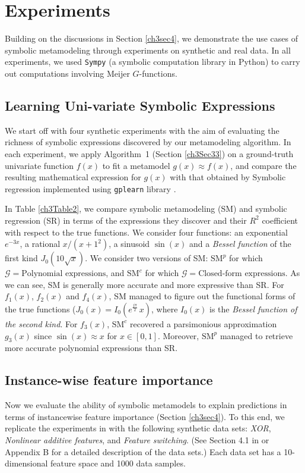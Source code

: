 \documentclass [PhD] {uclathes}
\begin{document}
\section{Experiments}
\label{ch3Sec5}
Building on the discussions in Section \ref{ch3sec4}, we demonstrate the use cases of symbolic metamodeling through experiments on synthetic and real data. In all experiments, we used \texttt{Sympy} \cite{10.7717/peerj-cs.103} (a symbolic computation library in Python) to carry out computations involving Meijer $G$-functions.

\subsection{Learning Uni-variate Symbolic Expressions} 
\label{Sec51}

We start off with four synthetic experiments with the aim of evaluating the richness of symbolic expressions discovered by our metamodeling algorithm. In each experiment, we apply Algorithm~1 (Section \ref{ch3Sec33}) on a ground-truth univariate function $f(x)$ to fit a metamodel $g(x) \approx f(x)$, and compare the resulting mathematical expression for $g(x)$ with that obtained by Symbolic regression \cite{orzechowski2018we} implemented using \texttt{gplearn} library \cite{stephens2015gplearn}.

In Table \ref{ch3Table2}, we compare symbolic metamodeling (SM) and symbolic regression (SR) in terms of the expressions they discover and their $R^2$ coefficient with respect to the true functions. We consider four functions: an exponential $e^{-3x}$, a rational $x/(x+1^2)$, a sinusoid $\sin(x)$ and a {\it Bessel function} of the first kind $J_0(10\sqrt{x})$. We consider two versions of SM: $\mbox{SM}^{p}$ for which $\mathcal{G}=\mbox{Polynomial expressions}$, and $\mbox{SM}^{c}$ for which $\mathcal{G}=\mbox{Closed-form expressions}$. As we can see, SM is generally more accurate and more expressive than SR. For $f_1(x)$, $f_2(x)$ and $f_4(x)$, SM managed to figure out the functional forms of the true functions  ($J_0(x) = I_{0}(e^{\frac{j\pi}{2}}\,x)$, where $I_0(x)$ is the {\it Bessel function of the second kind}. For $f_3(x)$, $\mbox{SM}^{c}$ recovered a parsimonious approximation $g_3(x)$ since $\sin(x) \approx x$ for $x \in [0,1]$. Moreover, $\mbox{SM}^{p}$ managed to retrieve more accurate polynomial expressions than SR. 

\subsection{ Instance-wise feature importance} 
\label{Sec52}
Now we evaluate the ability of symbolic metamodels to explain predictions in terms of instancewise feature importance (Section \ref{ch3sec4}). To this end, we replicate the experiments in \cite{chen2018learning} with the following synthetic data sets: {\it XOR}, {\it Nonlinear additive features}, and {\it Feature switching}. (See Section 4.1 in \cite{chen2018learning} or Appendix B for a detailed description of the data sets.) Each data set has a 10-dimensional feature space and 1000 data samples.
\end{document}
